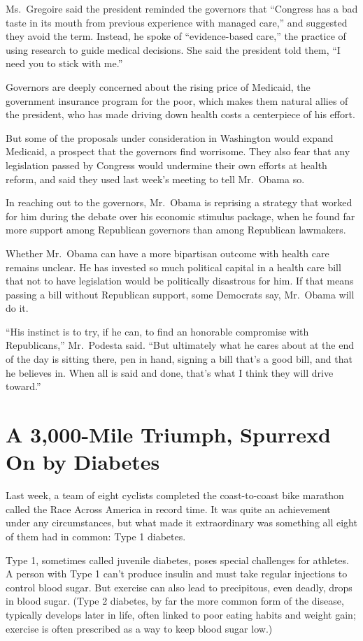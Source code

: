 ﻿\documentclass[12pt]{article}
\begin{document}
Ms.~Gregoire said the president reminded the governors that ``Congress has a bad taste in its mouth
from previous experience with managed care,'' and suggested they avoid the term. Instead, he spoke
of ``evidence-based care,'' the practice of using research to guide medical decisions. She said the
president told them, ``I need you to stick with me.''

Governors are deeply concerned about the rising price of Medicaid, the government insurance program
for the poor, which makes them natural allies of the president, who has made driving down health
costs a centerpiece of his effort.

But some of the proposals under consideration in Washington would expand Medicaid, a prospect that
the governors find worrisome. They also fear that any legislation passed by Congress would undermine
their own efforts at health reform, and said they used last week's meeting to tell Mr.~Obama so.

In reaching out to the governors, Mr.~Obama is reprising a strategy that worked for him during the
debate over his economic stimulus package, when he found far more support among Republican governors
than among Republican lawmakers.

Whether Mr.~Obama can have a more bipartisan outcome with health care remains unclear. He has
invested so much political capital in a health care bill that not to have legislation would be
politically disastrous for him. If that means passing a bill without Republican support, some
Democrats say, Mr.~Obama will do it.

``His instinct is to try, if he can, to find an honorable compromise with Republicans,'' Mr.~Podesta
said. ``But ultimately what he cares about at the end of the day is sitting there, pen in hand,
signing a bill that's a good bill, and that he believes in. When all is said and done, that's what I
think they will drive toward.''

\section{A 3,000-Mile Triumph, Spurrexd On by Diabetes}

Last week, a team of eight cyclists completed the coast-to-coast bike marathon called the Race
Across America in record time. It was quite an achievement under any circumstances, but what made it
extraordinary was something all eight of them had in common: Type 1 diabetes.

Type 1, sometimes called juvenile diabetes, poses special challenges for athletes. A person with
Type 1 can't produce insulin and must take regular injections to control blood sugar. But exercise
can also lead to precipitous, even deadly, drops in blood sugar. (Type 2 diabetes, by far the more
common form of the disease, typically develops later in life, often linked to poor eating habits and
weight gain; exercise is often prescribed as a way to keep blood sugar low.)
\end{document}
